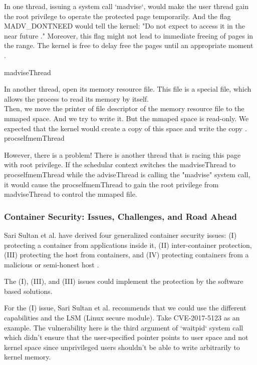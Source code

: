 \documentclass[12pt,a4paper]{article}
\begin{document}
In one thread, issuing a system call `madvise`, would make the user thread gain the root
privilege to operate the protected page temporarily. And the flag MADV\_DONTNEED would
tell the kernel: "Do not expect to access it in the near future \cite{Madvise}." Moreover,
this flag might not lead to immediate freeing of pages in the range. The kernel is free
to delay free the pages until an appropriate moment \cite{Madvise}.

\hypertarget{madvise}{madviseThread}


In another thread, open its memory resource file. This file is a special file, which allows
the process to read its memory by itself.\\

Then, we move the printer of file descriptor of the memory resource file to the mmaped
space. And we try to write it. But the mmaped space is read-only. We expected that the
kernel would create a copy of this space and write the copy \cite{root_exploit}.\\
\hypertarget{procself}{procselfmemThread}


However, there is a problem! There is another thread that is racing this page with root
privilege. If the schedular context switches the madviseThread to procselfmemThread while
the adviseThread is calling the "madvise" system call, it would cause the
procselfmemThread to gain the root privilege from madviseThread to control the mmaped file.

\subsubsection{Container Security: Issues, Challenges, and Road Ahead}
Sari Sultan et al. \cite{Road_Ahead} have derived four generalized container security issues:
(\RN{1}) protecting a container from applications inside it, (\RN{2}) inter-container
protection, (\RN{3}) protecting the host from containers, and (\RN{4}) protecting containers
from a malicious or semi-honest host \cite{Road_Ahead}.

The (\RN{1}), (\RN{3}), and (\RN{3}) issues could implement the protection by the software
based solutions.

For the (\RN{1}) issue, Sari Sultan et al. \cite{Road_Ahead} recommends that
we could use the different capabilities and the LSM (Linux secure module). Take
CVE-2017-5123 \cite{CVE-2017-5123} as an example. The vulnerability here is the third argument of
`waitpid` system call which didn't ensure that the user-specified pointer points to user space
and not kernel space since unprivileged users shouldn’t be able to write arbitrarily
to kernel memory.
\end{document}
